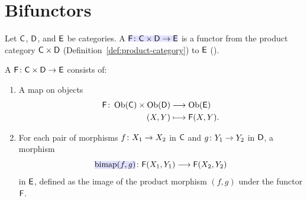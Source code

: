 \documentclass[../preamble]{subfiles}
\begin{document}
\section{Bifunctors}
\label{sec:bifunctor}

Let $\mathsf{C}$, $\mathsf{D}$, and $\mathsf{E}$ be categories.
A 
$\newmath{\Functor{F} \colon \Category{C} \times \Category{D} \lto \Category{E}}$
is a functor from the product category
$\mathsf{C} \times \mathsf{D}$
(Definition~\ref{def:product-category})
to $\mathsf{E}$
().

\begin{definition}[Bifunctor]
  \label{def:bifunctor}
  A 
  $\Functor{F} \colon \Category{C} \times \Category{D} \lto \Category{E}$
  consists of:
  \begin{enumerate}
    \item A map on objects
      \begin{equation}
        \begin{aligned}
          \Functor{F} \colon
            \Ob(\Category{C}) \times \Ob(\Category{D})
            &\lto \Ob(\Category{E}) \\
          (X, Y) &\lmapsto \Functor{F}(X, Y).
        \end{aligned}
        \label{eq:bifunctor-ob}
      \end{equation}

    \item For each pair of morphisms
      $f \colon X_1 \lto X_2$ in $\mathsf{C}$
      and $g \colon Y_1 \lto Y_2$ in $\mathsf{D}$,
      a morphism
      \begin{equation}
        \newmath{\operatorname{bimap}(f, g)}
          \colon \Functor{F}(X_1, Y_1) \lto \Functor{F}(X_2, Y_2)
        \label{eq:bimap}
      \end{equation}
      in $\mathsf{E}$,
      defined as the image of the product morphism $(f, g)$
      under the functor $\mathsf{F}$.
  \end{enumerate}
\end{definition}
\end{document}
